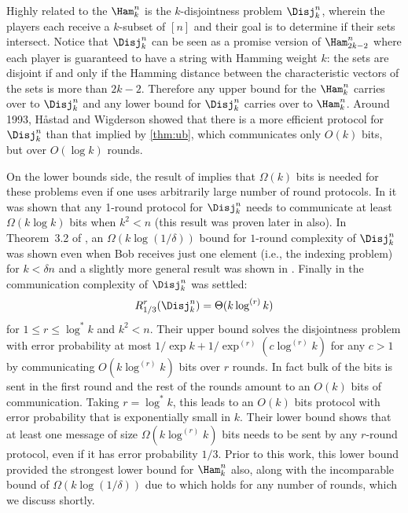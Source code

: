 Highly related to the $\Ham^n_k$ is the $k$-disjointness 
problem $\Disj^n_k$, wherein the players each receive a 
$k$-subset of $[n]$ and their goal is to determine if their 
sets intersect.
Notice that $\Disj^n_k$ can be seen as a promise version of
$\Ham^n_{2k-2}$ where each player is guaranteed to have a string
with Hamming weight $k$: the sets are disjoint if and only if the
Hamming distance between the characteristic vectors of the sets
is more than $2k-2$. Therefore any upper bound for the $\Ham^n_k$ 
carries over to $\Disj^n_k$ and any lower bound for $\Disj^n_k$
carries over to $\Ham^n_k$.
Around 1993, 
Håstad and Wigderson \cite{HastadW2007} showed that
there is a more efficient protocol for $\Disj^n_k$ than that implied 
by \autoref{thm:ub}, which communicates only $O(k)$ bits, but over
$O(\log k)$ rounds.

On the lower bounds side, the result of \cite{KalyanasundaramS1992}
implies that $\Omega(k)$ bits is needed for these problems even
if one uses arbitrarily large number of round protocols.
In \cite{BuhrmanGMW2012} it was shown that
any 1-round protocol for $\Disj^n_k$ needs to communicate
at least $\Omega(k \log k)$ bits when $k^2<n$
(this result was proven later in \cite{DasguptaKS12} also).
In Theorem~3.2 of \cite{Saglam2011}, an $\Omega(k\log(1/\delta))$
bound for $1$-round complexity of $\Disj^n_k$ was shown even 
when Bob receives just one element (i.e., the indexing problem) 
for $k<\delta n$ and a 
slightly more general result was shown in \cite{JayramW2011}.
Finally in \cite{SaglamT2013} the communication complexity
of $\Disj^n_k$ was settled:
\begin{align*}
R^r_{1/3}(\Disj^n_k)=\Theta(k\log^{(r)}k)
\end{align*}
for $1\le r \le \log^*k$ and $k^2<n$.
Their upper bound solves the disjointness problem with 
error probability at most $1/\exp k + 1/\exp^{(r)}(c\log^{(r)}k)$ 
for any $c>1$ by communicating
$O(k \log^{(r)} k)$ bits over $r$ rounds. In fact bulk of the bits
is sent in the first round and the rest of the rounds
amount to an $O(k)$ bits of communication. Taking $r=\log^* k$,
this leads to an $O(k)$ bits protocol with error probability 
that is exponentially small in $k$.
Their lower bound shows that at least one
message of size 
$\Omega(k\log^{(r)} k)$ bits needs to be sent by any 
$r$-round protocol, even if it has error probability $1/3$.
Prior to this work, this lower bound provided the strongest lower
bound for $\Ham^n_k$ also, along with the incomparable bound of 
$\Omega(k\log (1/\delta))$ due to \cite{BlaisBG2014}
which holds for any number of rounds, which we discuss shortly.


